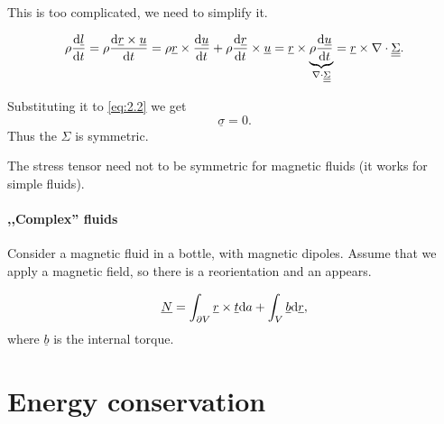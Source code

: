 \documentclass[11pt,oneside]{book}
\renewcommand{\vec}[1]{\underline{#1}}
\theoremstyle{definition} %
\theoremstyle{plain} %
\theoremstyle{remark} %
\theoremstyle{underline}
\begin{document}
  This is too complicated, we need to simplify it.
  
  \begin{displaymath}
    \rho \dfrac{ \vec l }{t} = \rho \dfrac{\vec r \times \vec u}{t} 
    = \rho \vec r \times \dfrac{\vec u}{t} + \rho \dfrac{ \vec r }{t} \times \vec u
    = \vec r \times \underbrace{\rho \dfrac{\vec u}{t}}_{\nabla \cdot \ten \Sigma} 
    = \vec r \times \nabla \cdot \ten \Sigma.
  \end{displaymath}

  Substituting it to  \ref{eq:2.2} we get
  \begin{displaymath}
    \vec \sigma = 0.
  \end{displaymath}
  Thus the $\Sigma $ is symmetric.

  The stress tensor need not to be symmetric for magnetic fluids (it works for simple fluids).


  \paragraph{,,Complex'' fluids}

  Consider a magnetic fluid in a bottle, with magnetic dipoles.
  Assume that we apply a magnetic field, so there is a reorientation and an  appears.
  
  \begin{displaymath}
    \vec N = \int_{\partial V} \vec r \times \vec t \d a + \int_{V} \vec b \d \vec r,
  \end{displaymath}
  where $\vec b$ is the internal torque.
  
  
  \section{Energy conservation}
  \begin{figure}
    \centering
  \end{figure}
\end{document}
